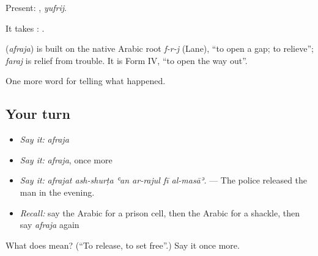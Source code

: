 Present: , \emph{yufrij}.

It takes :   .

\begin{cousinweb}
\textbf{} (\emph{afraja}) is built on the native Arabic root \emph{f-r-j} (Lane), \textquotedblleft{}to open a gap; to relieve\textquotedblright{}; \emph{faraj} is relief from trouble. It is Form IV, \textquotedblleft{}to open the way out\textquotedblright{}.
\end{cousinweb}

\begin{grammarlens}[title={What you've built}]
One more word for telling what happened.
\end{grammarlens}

\subsection*{Your turn}
\begin{itemize}
\raggedright
  \item \emph{Say it:} \emph{afraja}
  \item \emph{Say it:} \emph{afraja}, once more
  \item \emph{Say it:} \emph{afrajat ash-shurṭa ʿan ar-rajul fī al-masāʾ.} — The police released the man in the evening.
  \item \emph{Recall:} say the Arabic for a prison cell, then the Arabic for a shackle, then say \emph{afraja} again
\end{itemize}

\begin{tcolorbox}[breakable,colback=teal!4,colframe=teal!35!black,title={Before you move on}]
What does  mean? (\textquotedblleft{}To release, to set free\textquotedblright{}.) Say it once more.
\end{tcolorbox}
